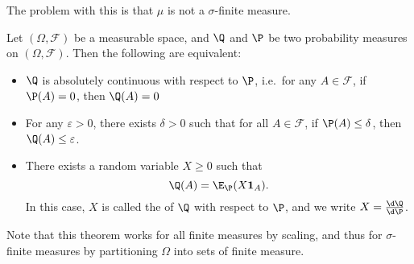 \documentclass[a4paper]{article}
\begin{document}
The problem with this is that $\mu$ is not a $\sigma$-finite measure.

\begin{thm}
  Let $(\Omega, \mathcal{F})$ be a measurable space, and $\Q$ and $\P$ be two probability measures on $(\Omega, \mathcal{F})$. Then the following are equivalent:
  \begin{itemize}
    \item $\Q$ is absolutely continuous with respect to $\P$, i.e.\ for any $A \in \mathcal{F}$, if $\P(A) = 0$, then $\Q(A) = 0$
    \item For any $\varepsilon > 0$, there exists $\delta > 0$ such that for all $A \in \mathcal{F}$, if $\P(A) \leq \delta$, then $\Q(A) \leq \varepsilon$.
    \item There exists a random variable $X \geq 0$ such that
      \[
        \Q(A) = \E_{\P}(X \mathbf{1}_A).
      \]
      In this case, $X$ is called the  of $\Q$ with respect to $\P$, and we write $X = \frac{\d \Q}{\d \P}$.
  \end{itemize}
\end{thm}
Note that this theorem works for all finite measures by scaling, and thus for $\sigma$-finite measures by partitioning $\Omega$ into sets of finite measure.
\end{document}
